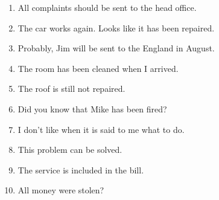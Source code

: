 \begin{enumerate}
	\item All complaints should be sent to the head office.
	\item The car works again. Looks like it has been repaired.
	\item Probably, Jim will be sent to the England in August.
	\item The room has been cleaned when I arrived.
	\item The roof is still not repaired.
	\item Did you know that Mike has been fired?
	\item I don't like when it is said to me what to do.
	\item This problem can be solved.
	\item The service is included in the bill.
	\item All money were stolen?
\end{enumerate}

